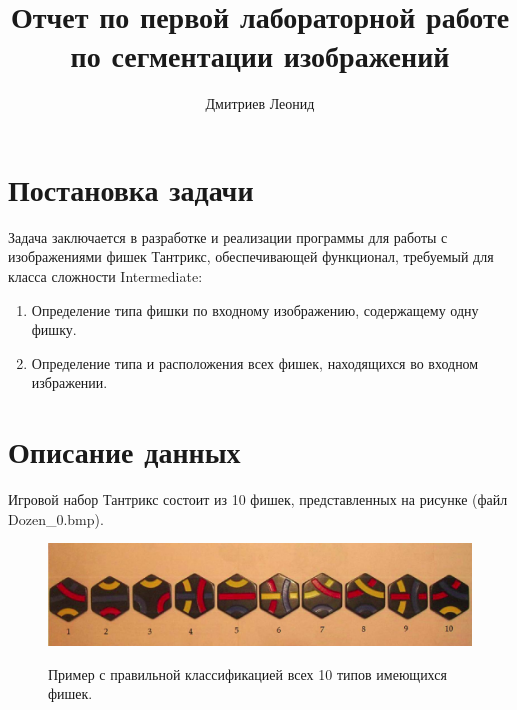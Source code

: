 \documentclass[10pt]{article}
\author{Дмитриев Леонид}
\title{Отчет по первой лабораторной работе по сегментации изображений}
\begin{document}
	{
		\LARGE
		\maketitle
	}
	
	\clearpage
	
	
	{ \large \tableofcontents} 
	
	\clearpage
	
	
	
	\section*{Постановка задачи}
	
	Задача заключается в разработке и реализации программы для работы с изображениями фишек Тантрикс, обеспечивающей функционал, требуемый для класса сложности Intermediate:
	
	\begin{enumerate}
		\item Определение типа фишки по входному изображению, содержащему одну фишку.
		
		\item Определение типа и расположения всех фишек, находящихся во входном избражении.
	\end{enumerate}
	
	
	\section*{Описание данных}
	
	Игровой набор Тантрикс состоит из 10 фишек, представленных на рисунке (файл Dozen\_0.bmp).
	
	
	\begin{figure}[h]
		\begin{center}
			{\includegraphics[width=1.0\linewidth]{data/Dozen_0.pdf}}
		\end{center}
	    \caption{Пример с правильной классификацией всех 10 типов имеющихся фишек.}
		\label{ris:image1}
	\end{figure}
	
\end{document}
